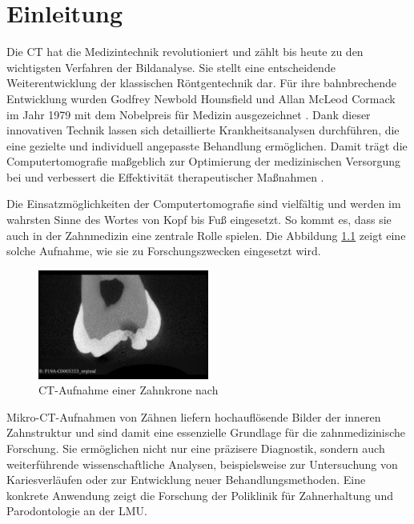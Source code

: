 \chapter{Einleitung}
\label{chap:einleitung} Die \ac{CT} hat die Medizintechnik revolutioniert und
zählt bis heute zu den wichtigsten Verfahren der Bildanalyse. Sie stellt eine entscheidende
Weiterentwicklung der klassischen Röntgentechnik dar. Für ihre bahnbrechende
Entwicklung wurden Godfrey Newbold Hounsfield und Allan McLeod Cormack im Jahr
1979 mit dem Nobelpreis für Medizin ausgezeichnet \citep[vgl.][S.~12]{handels2000}.
Dank dieser innovativen Technik lassen sich detaillierte Krankheitsanalysen
durchführen, die eine gezielte und individuell angepasste Behandlung ermöglichen.
Damit trägt die Computertomografie maßgeblich zur Optimierung der medizinischen
Versorgung bei und verbessert die Effektivität therapeutischer Maßnahmen \citep[vgl.][S.~207]{de20083d}.

Die Einsatzmöglichkeiten der Computertomografie sind vielfältig und werden im wahrsten
Sinne des Wortes von Kopf bis Fuß eingesetzt. So kommt es, dass sie auch in der Zahnmedizin
eine zentrale Rolle spielen. Die Abbildung \ref{fig:ct_aufnahme_eines_zahns}
zeigt eine solche Aufnahme, wie sie zu Forschungszwecken eingesetzt wird.

\begin{figure}[h]
	\centering
	\includegraphics[width=0.5\textwidth]{img/micro_ct_orginal.jpg}
	\caption{CT-Aufnahme einer Zahnkrone nach \citet{heck2024}}
	\label{fig:ct_aufnahme_eines_zahns}
\end{figure}

Mikro-\ac{CT}-Aufnahmen von Zähnen liefern hochauflösende Bilder der inneren Zahnstruktur
und sind damit eine essenzielle Grundlage für die zahnmedizinische Forschung.
Sie ermöglichen nicht nur eine präzisere Diagnostik, sondern auch weiterführende
wissenschaftliche Analysen, beispielsweise zur Untersuchung von Kariesverläufen
oder zur Entwicklung neuer Behandlungsmethoden. Eine konkrete Anwendung zeigt die
Forschung der Poliklinik für Zahnerhaltung und Parodontologie an der \ac{LMU}.

